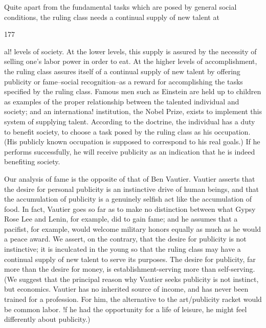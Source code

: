 \documentclass[10pt,twoside]{memoir}
\begin{document}
\begin{enumerate}
{{Quite apart from the fundamental tasks which are posed by general 
social conditions, the ruling class needs a continual supply of new talent at 


177 


al! levels of society. At the lower levels, this supply is assured by the 
necessity of selling one's labor power in order to eat. At the higher levels of 
accomplishment, the ruling class assures itself of a continual supply of new 
talent by offering publicity or fame--social recognition--as a reward for 
accomplishing the tasks specified by the ruling class. Famous men such as 
Einstein are held up to children as examples of the proper relationship 
between the talented individual and society; and an internationa! institution, 
the Nobel Prize, exists to implement this system of supplying talent. 
According to the doctrine, the individual has a duty to benefit society, to 
choose a task posed by the ruling class as his occupation. (His publicly 
known occupation is supposed to correspond to his real goals.) If he 
performs successfully, he will receive publicity as an indication that he is 
indeed benefiting society. 

Our analysis of fame is the opposite of that of Ben Vautier. Vautier 
asserts that the desire for personal publicity is an instinctive drive of human 
beings, and that the accumulation of publicity is a genuinely selfish act like 
the accumulation of food. In fact, Vautier goes so far as to make no 
distinction between what Gypsy Rose Lee and Lenin, for example, did to 
gain fame; and he assumes that a pacifist, for example, would welcome 
military honors equally as much as he would a peace award. We assert, on 
the contrary, that the desire for publicity is not instinctive; it is inculcated in 
the young so that the ruling class may have a continual supply of new talent 
to serve its purposes. The desire for publicity, far more than the desire for 
money, is establishment-serving more than self-serving. (We suggest that the 
principal reason why Vautier seeks publicity is not instinct, but economics. 
Vautier has no inherited source of income, and has never been trained for a 
profession. For him, the alternative to the art/publicity racket would be 
common labor. !f he had the opportunity for a life of leisure, he might feel 
differently about publicity.) 

}}
\end{enumerate}
\end{document}
